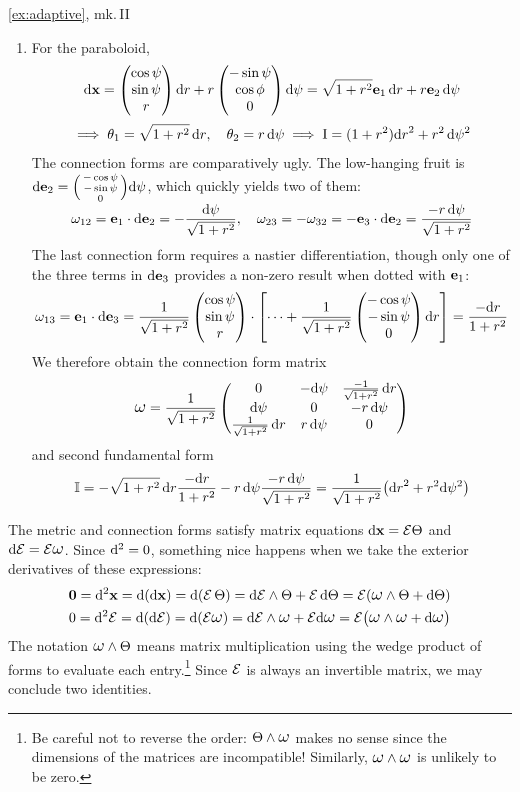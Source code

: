 \begin{examples*}{\ref{ex:adaptive}, mk.\,II}{}
\begin{enumerate}
  	\item For the paraboloid,
  	\begin{gather*}
  	\mathrm{d}{\mathbf{x}}=\begin{pmatrix}\cos\psi\\\sin\psi\\r\end{pmatrix}{\mathrm{d}r} +r\begin{pmatrix}-\sin\psi\\\cos\phi\\0\end{pmatrix}\mathrm{d}\psi =\sqrt{1+r^2}{\mathbf{e}}_1\,{\mathrm{d} r}+r{\mathbf{e}}_2\,\mathrm{d}\psi\\[2pt]
  	\implies \theta_1=\sqrt{1+r^2}\,{\mathrm{d} r},\quad \theta_2=r\,\mathrm{d}\psi \implies \mathrm{I}=(1+r^2){\mathrm{d} r}^2+r^2\,\mathrm{d}\psi^2
  	\end{gather*}
  	The connection forms are comparatively ugly. The low-hanging fruit is $\mathrm{d}{\mathbf{e}}_2=\smash[b]{\left(\begin{smallmatrix}-\cos\psi\\-\sin\psi\\0\end{smallmatrix}\right)}\mathrm{d}\psi$, which quickly yields two of them:
  \[\omega_{12}={\mathbf{e}}_1\cdot\mathrm{d}{\mathbf{e}}_2=-\frac{\mathrm{d}\psi}{\sqrt{1+r^2}},\quad \omega_{23}=-\omega_{32}=-{\mathbf{e}}_3\cdot\mathrm{d}{\mathbf{e}}_2=\frac{-r\,\mathrm{d}\psi}{\sqrt{1+r^2}}\]
  The last connection form requires a nastier differentiation, though only one of the three terms in $\mathrm{d}{\mathbf{e}}_3$ provides a non-zero result when dotted with ${\mathbf{e}}_1$:
  \[
  \omega_{13}={\mathbf{e}}_1\cdot\mathrm{d}{\mathbf{e}}_3=\frac 1{\sqrt{1+r^2}}\begin{pmatrix}\cos\psi\\\sin\psi\\r\end{pmatrix}\cdot\left[\cdots+\frac 1{\sqrt{1+r^2}}\begin{pmatrix}-\cos\psi\\-\sin\psi\\0\end{pmatrix}{\mathrm{d}r}\right] =\frac{-{\mathrm{d} r}}{1+r^2}
  \]
  We therefore obtain the connection form matrix
  \[
  \lomega=\frac 1{\sqrt{1+r^2}}
	  \begin{pmatrix}
		0&-\D\psi&\frac{-1}{\sqrt{1+r^2}}\,\dr\\
		\D\psi&0&-r\,\D\psi\\
		\frac 1{\sqrt{1+r^2}}\,\dr&r\,\D\psi&0
	\end{pmatrix}
	\]
	and second fundamental form
	\[
	\mathbb{I}=-\sqrt{1+r^2}\,{\mathrm{d} r}\frac{-{\mathrm{d} r}}{1+r^2} -r\,\mathrm{d}\psi\frac{-r\,\mathrm{d}\psi}{\sqrt{1+r^2}} =\frac 1{\sqrt{1+r^2}}\bigl({\mathrm{d} r}^2+r^2\mathrm{d}\psi^2\bigr)
	\]
	\end{enumerate}
\end{examples*}



The metric and connection forms satisfy matrix equations $\mathrm{d}{\mathbf{x}}=\mathcal{E}\Theta$ and $\D \cE=\cE\lomega$. Since $\mathrm{d}^2=0$, something nice happens when we take the exterior derivatives of these expressions:
\begin{gather*}
\V0=\D^2\vx=\D(\dvx)=\D(\cE\,\Theta)=\D \cE\wedge\Theta+\cE\,\D\Theta =\cE(\lomega\wedge\Theta+\D\Theta)\\
0=\D^2 \cE=\D(\D \cE)=\D(\cE\lomega)=\D \cE\wedge\lomega+\cE\D\lomega = \cE\bigl(\lomega\wedge\lomega+\D\lomega\bigr)
\end{gather*}
The notation $\lomega\wedge\Theta$ means matrix multiplication using the wedge product of forms to evaluate each entry.\footnote{Be careful not to reverse the order: $\Theta\wedge\lomega$ makes no sense since the dimensions of the matrices are incompatible! Similarly, $\lomega\wedge\lomega$ is unlikely to be zero.} Since $\mathcal{E}$ is always an invertible matrix, we may conclude two identities. 


